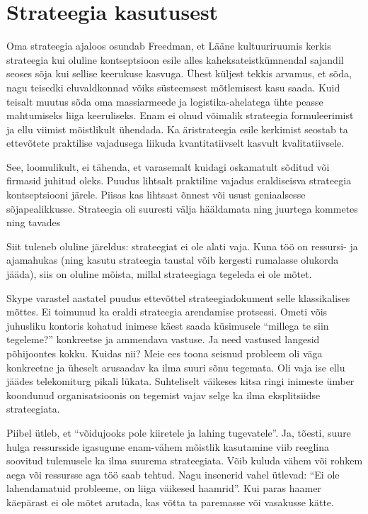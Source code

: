 \documentclass{tufte-book}
\begin{document}
\section{Strateegia kasutusest}
\label{sec:strateegia:kasutu}
Oma strateegia ajaloos osundab Freedman, et Lääne kultuuriruumis kerkis strateegia kui oluline kontseptsioon esile alles kaheksateistkümnendal sajandil seoses sõja kui sellise keerukuse kasvuga\cite{freedman2013strategy}. Ühest küljest tekkis arvamus, et sõda, nagu teisedki eluvaldkonnad võiks süsteemsest mõtlemisest kasu saada. Kuid teisalt muutus sõda oma massiarmeede ja logistika-ahelatega ühte peasse mahtumiseks liiga keeruliseks. Enam ei olnud võimalik strateegia formuleerimist ja ellu viimist mõistlikult ühendada. Ka äristrateegia esile kerkimist seostab ta ettevõtete praktilise vajadusega liikuda kvantitatiivselt kasvult kvalitatiivsele.

See, loomulikult, ei tähenda, et varasemalt kuidagi oskamatult sõditud või firmasid juhitud oleks. Puudus lihtsalt praktiline vajadus eraldiseisva strateegia kontseptsiooni järele. Piisas kas lihtsast õnnest või usust geniaalsesse sõjapealikkusse. Strateegia oli suuresti välja hääldamata ning juurtega kommetes ning tavades

Siit tuleneb oluline järeldus: strateegiat ei ole alati vaja. Kuna töö on ressursi- ja ajamahukas (ning kasutu strateegia taustal võib kergesti rumalasse olukorda jääda), siis on oluline mõista, millal strateegiaga tegeleda ei ole mõtet.

Skype varastel aastatel puudus ettevõttel strateegiadokument selle klassikalises mõttes. Ei toimunud ka eraldi strateegia arendamise protsessi. Ometi võis juhusliku kontoris kohatud inimese käest saada küsimusele \enquote{millega te siin tegeleme?} konkreetse ja ammendava vastuse. Ja need vastused langesid põhijoontes kokku. Kuidas nii? Meie ees toona seisnud probleem oli väga konkreetne ja üheselt arusaadav ka ilma suuri sõnu tegemata. Oli vaja ise ellu jäädes telekomiturg pikali lükata. Suhteliselt väikeses kitsa ringi inimeste ümber koondunud organisatsioonis on tegemist vajav selge ka ilma eksplitsiidse strateegiata. 

Piibel ütleb, et \enquote{võidujooks pole kiiretele ja lahing tugevatele}. Ja, tõesti, suure hulga ressursside igasugune enam-vähem mõistlik kasutamine viib reeglina soovitud tulemusele ka ilma suurema strateegiata. Võib kuluda vähem või rohkem aega või ressursse aga töö saab tehtud. Nagu insenerid vahel ütlevad: \enquote{Ei ole lahendamatuid probleeme, on liiga väikesed haamrid}. Kui paras haamer käepärast ei ole mõtet arutada, kas võtta ta paremasse või vasakusse kätte.
\end{document}
